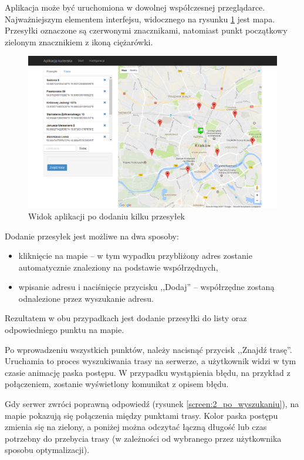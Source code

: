 Aplikacja może być uruchomiona w dowolnej współczesnej przeglądarce. Najważniejszym elementem interfejsu, widocznego na rysunku \ref{screen:1_przed_uruchomieniem} jest mapa. Przesyłki oznaczone są czerwonymi znacznikami, natomiast punkt początkowy zielonym znacznikiem z ikoną ciężarówki.
\begin{figure}[t]
	\centering
	\includegraphics[width=0.7\linewidth]{screen/1_przed_uruchomieniem}
	\caption{Widok aplikacji po dodaniu kilku przesyłek}
	\label{screen:1_przed_uruchomieniem}
\end{figure}

Dodanie przesyłek jest możliwe na dwa sposoby: 
\begin{itemize}
	\item kliknięcie na mapie -- w tym wypadku przybliżony adres zostanie automatycznie znaleziony na podstawie współrzędnych,
	\item wpisanie adresu i naciśnięcie przycisku ,,Dodaj'' -- współrzędne zostaną odnalezione przez wyszukanie adresu.
\end{itemize}

Rezultatem w obu przypadkach jest dodanie przesyłki do listy oraz odpowiedniego punktu na mapie.

Po wprowadzeniu wszystkich punktów, należy nacisnąć przycisk ,,Znajdź trasę''. Uruchamia to proces wyszukiwania trasy na serwerze, a użytkownik widzi w tym czasie animację paska postępu. W przypadku wystąpienia błędu, na przykład z połączeniem, zostanie wyświetlony komunikat z opisem błędu.

Gdy serwer zwróci poprawną odpowiedź (rysunek \ref{screen:2_po_wyszukaniu}), na mapie pokazują się połączenia między punktami trasy. Kolor paska postępu zmienia się na zielony, a poniżej można odczytać łączną długość lub czas potrzebny do przebycia trasy (w zależności od wybranego przez użytkownika sposobu optymalizacji).

